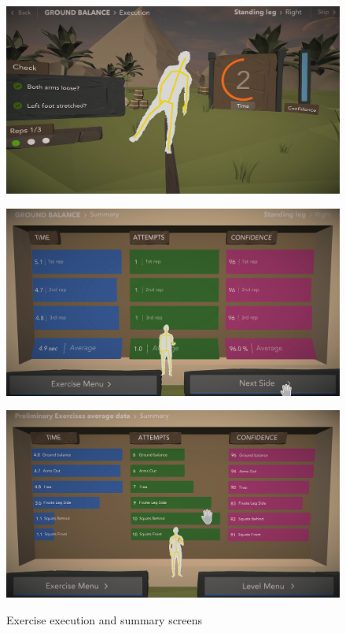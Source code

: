 \begin{figure}[htb]
	\centering
	\begin{minipage}[t]{1\linewidth}
		\centering
		\includegraphics[width=0.57\linewidth]{Pictures/5_Workflow/11_3_ExerciseExecutionRep}
		\label{fig:5_3_exercise_execution}
	\end{minipage}
	\hfill
	\begin{minipage}[t]{0.49\linewidth}
		\centering
		\includegraphics[width=1\linewidth]{Pictures/5_Workflow/12_ExerciseSummary}
		\label{fig:5_3_exercise_summary}
	\end{minipage}
	\hfill
	\begin{minipage}[t]{0.49\linewidth}
		\centering
		\includegraphics[width=1\linewidth]{Pictures/5_Workflow/13_TierSummary}
		\label{fig:5_3_level_summary}
	\end{minipage}
	\caption{Exercise execution and summary screens}
	\label{fig:5_3_exercise_sequence}
\end{figure}
